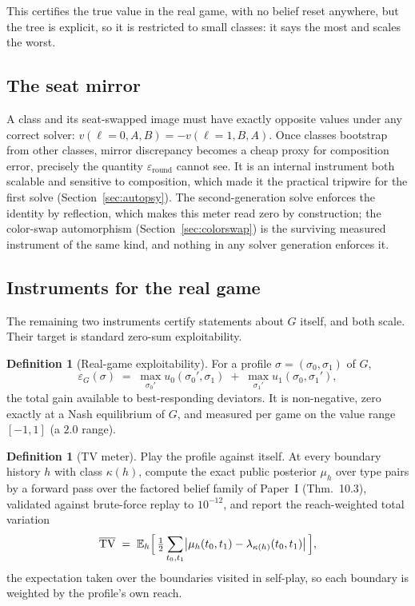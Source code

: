 \documentclass[11pt]{article}
\theoremstyle{plain}
\theoremstyle{definition}
\newtheorem{definition}[theorem]{Definition}
\theoremstyle{remark}
\newcommand{\game}{\ensuremath{G}}
\newcommand{\epsG}{\ensuremath{\varepsilon_{\game}}}
\begin{document}
This certifies the true value in the real game, with no belief reset anywhere,
but the tree is explicit, so it is restricted to small classes: it says the most
and scales the worst.

\subsection{The seat mirror}\label{sec:mirror}

A class and its seat-swapped image must have exactly opposite values under any
correct solver: $v(\ell{=}0,A,B) = -v(\ell{=}1,B,A)$. Once classes bootstrap
from other classes, mirror discrepancy becomes a cheap proxy for composition
error, precisely the quantity $\varepsilon_{\text{round}}$ cannot see. It is
an internal instrument both scalable and sensitive to composition, which made
it the practical tripwire for the first solve (Section~\ref{sec:autopsy}).
The second-generation solve enforces the identity by reflection, which makes
this meter read zero by construction; the color-swap automorphism
(Section~\ref{sec:colorswap}) is the surviving measured instrument of the
same kind, and nothing in any solver generation enforces it.

\subsection{Instruments for the real game}\label{sec:realmeters}

The remaining two instruments certify statements about $\game$ itself, and both
scale. Their target is standard zero-sum exploitability.

\begin{definition}[Real-game exploitability]\label{def:epsg}
For a profile $\sigma=(\sigma_0,\sigma_1)$ of $\game$,
\[
  \epsG(\sigma) \;=\;
  \max_{\sigma_0'} u_0(\sigma_0',\sigma_1)
  \;+\;
  \max_{\sigma_1'} u_1(\sigma_0,\sigma_1'),
\]
the total gain available to best-responding deviators. It is
non-negative, zero exactly at a Nash equilibrium of $\game$, and
measured per game on the value range $[-1,1]$ (a $2.0$ range).
\end{definition}

\begin{definition}[TV meter]\label{def:tv}
Play the profile against itself. At every boundary history $h$ with
class $\kappa(h)$, compute the exact public posterior $\mu_h$ over type
pairs by a forward pass over the factored belief family of Paper~I
(Thm.~10.3), validated against brute-force replay to $10^{-12}$, and
report the reach-weighted total variation
\[
  \overline{\mathrm{TV}}
  \;=\;
  \mathbb{E}_{h}\Bigl[\,
    \tfrac12 \sum_{t_0,t_1}
    \bigl|\mu_h(t_0,t_1)-\lambda_{\kappa(h)}(t_0,t_1)\bigr|
  \,\Bigr],
\]
the expectation taken over the boundaries visited in self-play, so each
boundary is weighted by the profile's own reach.
\end{definition}
\end{document}
